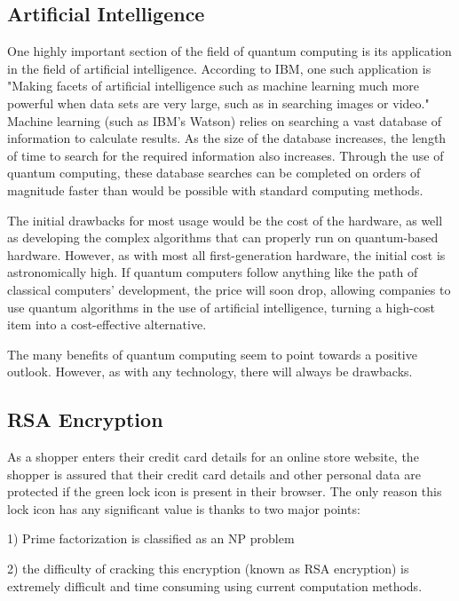 \documentclass[10pt,journal,compsoc]{IEEEtran}
\begin{document}
 
 \subsection{Artificial Intelligence}
One highly important section of the field of quantum computing is its application in the field of artificial intelligence. According to IBM, one such application is "Making facets of artificial intelligence such as machine learning much more powerful when data sets are very large, such as in searching images or video."\cite{IBM} Machine learning (such as IBM's Watson) relies on searching a vast database of information to calculate results. As the size of the database increases, the length of time to search for the required information also increases. Through the use of quantum computing, these database searches can be completed on orders of magnitude faster than would be possible with standard computing methods\cite{IBM}. 

The initial drawbacks for most usage would be the cost of the hardware, as well as developing the complex algorithms that can properly run on quantum-based hardware. However, as with most all first-generation hardware, the initial cost is astronomically high. If quantum computers follow anything like the path of classical computers' development, the price will soon drop, allowing companies to use quantum algorithms in the use of artificial intelligence, turning a high-cost item into a cost-effective alternative. 

The many benefits of quantum computing seem to point towards a positive outlook. However, as with any technology, there will always be drawbacks. 
 

\subsection{RSA Encryption}

As a shopper enters their credit card details for an online store website, the shopper is assured that their credit card details and other personal data are protected if the green lock icon is present in their browser. The only reason this lock icon has any significant value is thanks to two major points: 

1) Prime factorization is classified as an NP problem

2) the difficulty of cracking this encryption (known as RSA encryption) is extremely difficult and time consuming using current computation methods. 
\end{document}
